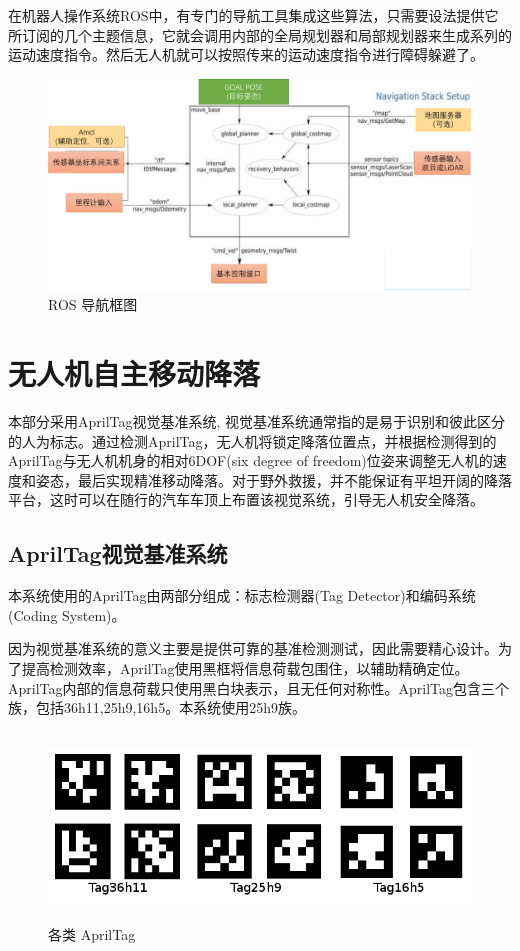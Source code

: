 在机器人操作系统ROS中，有专门的导航工具集成这些算法，只需要设法提供它所订阅的几个主题信息，它就会调用内部的全局规划器和局部规划器来生成系列的运动速度指令。然后无人机就可以按照传来的运动速度指令进行障碍躲避了。

\begin{figure}[h]
    \centering
    \includegraphics[width=13cm]{figures/ROS导航框图.pdf}
    \caption{ROS 导航框图}\label{ROS}
\end{figure}


\section{无人机自主移动降落}

本部分采用AprilTag视觉基准系统, 视觉基准系统通常指的是易于识别和彼此区分的人为标志。通过检测AprilTag，无人机将锁定降落位置点，并根据检测得到的AprilTag与无人机机身的相对6DOF(six degree of freedom)位姿来调整无人机的速度和姿态，最后实现精准移动降落。对于野外救援，并不能保证有平坦开阔的降落平台，这时可以在随行的汽车车顶上布置该视觉系统，引导无人机安全降落。

\subsection{AprilTag视觉基准系统}

本系统使用的AprilTag由两部分组成：标志检测器(Tag Detector)和编码系统(Coding System)。

因为视觉基准系统的意义主要是提供可靠的基准检测测试，因此需要精心设计。为了提高检测效率，AprilTag使用黑框将信息荷载包围住，以辅助精确定位。AprilTag内部的信息荷载只使用黑白块表示，且无任何对称性。AprilTag包含三个族，包括36h11,25h9,16h5。本系统使用25h9族。

\begin{figure}[h]
    \centering
    \includegraphics[height=5cm]{figures/各类AprilTag.png}
    \caption{各类 AprilTag}\label{ROS}
\end{figure}

